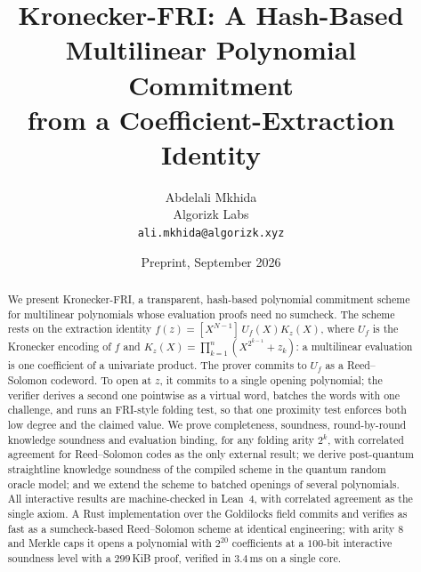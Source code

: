 \documentclass[11pt]{article}
\title{Kronecker-FRI: A Hash-Based Multilinear Polynomial Commitment\\ from a Coefficient-Extraction Identity}
\author{Abdelali Mkhida\\ Algorizk Labs\\ \texttt{ali.mkhida@algorizk.xyz}}
\date{Preprint, September 2026}
\theoremstyle{definition}
\begin{document}
\maketitle
\begin{abstract}
We present Kronecker-FRI, a transparent, hash-based polynomial commitment scheme for multilinear polynomials whose evaluation proofs need no sumcheck.
The scheme rests on the extraction identity $f(z) = [X^{N-1}]\,U_f(X)K_z(X)$, where $U_f$ is the Kronecker encoding of $f$ and $K_z(X) = \prod_{k=1}^{n}(X^{2^{k-1}} + z_k)$: a multilinear evaluation is one coefficient of a univariate product.
The prover commits to $U_f$ as a Reed--Solomon codeword. To open at $z$, it commits to a single opening polynomial; the verifier derives a second one pointwise as a virtual word, batches the words with one challenge, and runs an FRI-style folding test, so that one proximity test enforces both low degree and the claimed value.
We prove completeness, soundness, round-by-round knowledge soundness and evaluation binding, for any folding arity $2^k$, with correlated agreement for Reed--Solomon codes as the only external result; we derive post-quantum straightline knowledge soundness of the compiled scheme in the quantum random oracle model; and we extend the scheme to batched openings of several polynomials.
All interactive results are machine-checked in Lean~4, with correlated agreement as the single axiom.
A Rust implementation over the Goldilocks field commits and verifies as fast as a sumcheck-based Reed--Solomon scheme at identical engineering; with arity $8$ and Merkle caps it opens a polynomial with $2^{20}$ coefficients at a $100$-bit interactive soundness level with a $299$\,KiB proof, verified in $3.4$\,ms on a single core.
\end{abstract}

\tableofcontents

















\appendix


\end{document}
